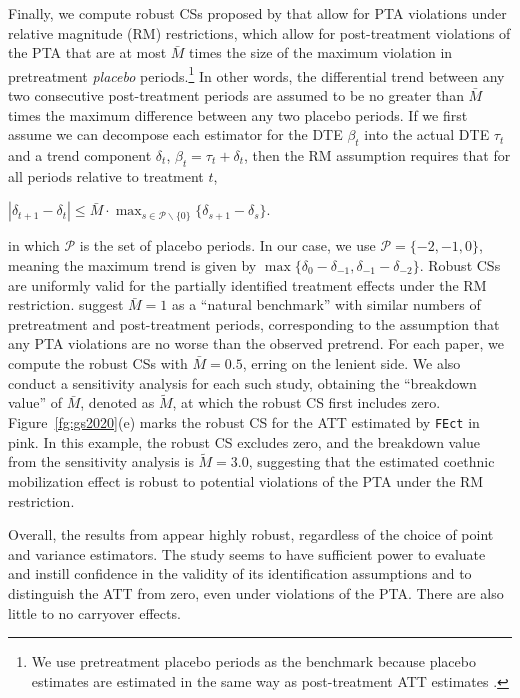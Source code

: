 \documentclass[12pt]{article}
\begin{document}
Finally, we compute robust CSs proposed by \citet{rambachan2023more} that allow for PTA violations under relative magnitude (RM) restrictions, which allow for post-treatment violations of the PTA that are at most $\bar{M}$ times the size of the maximum violation in pretreatment \emph{placebo} periods.\footnote{We use pretreatment placebo periods as the benchmark because placebo estimates are estimated in the same way as post-treatment ATT estimates \citep{Roth2024interpret}.} In other words, the differential trend between any two consecutive post-treatment periods are assumed to be no greater than $\bar{M}$ times the maximum difference between any two placebo periods. If we first assume we can decompose each estimator for the DTE $\beta_t$ into the actual DTE $\tau_t$ and a trend component $\delta_t$, $\beta_t=\tau_t+\delta_t$, then the RM assumption requires that for all periods relative to treatment $t$, 
\begin{center}
    $|\delta_{t+1}-\delta_t| \leq \bar{M} \cdot \max_{s\in \mathcal{P}\backslash\{0\}}\{\delta_{s+1} - \delta_s\}$. 
\end{center}
in which $\mathcal{P}$ is the set of placebo periods. In our case, we use $\mathcal{P}=\{-2, -1, 0\}$, meaning the maximum trend is given by $\max\{\delta_{0}-\delta_{-1}, \delta_{-1}-\delta_{-2}\}$. Robust CSs are uniformly valid for the partially identified treatment effects under the RM restriction. \citet[][p. 2653]{rambachan2023more} suggest $\bar{M}=1$ as a ``natural benchmark'' with similar numbers of pretreatment and post-treatment periods, corresponding to the assumption that any PTA violations are no worse than the observed pretrend.
For each paper, we compute the robust CSs with $\bar{M}=0.5$, erring on the lenient side. We also conduct a sensitivity analysis for each such study, obtaining the ``breakdown value'' of $\bar{M}$, denoted as $\tilde{M}$, at which the robust CS first includes zero. Figure~\ref{fg:gs2020}(e) marks the robust CS for the ATT estimated by \texttt{FEct} in pink. In this example, the robust CS excludes zero, and the breakdown value from the sensitivity analysis is $\tilde{M}=3.0$, suggesting that the estimated coethnic mobilization effect is robust to potential violations of the PTA under the RM restriction. 

Overall, the results from \citet{Grumbach2020} appear highly robust, regardless of the choice of point and variance estimators. The study seems to have sufficient power to evaluate and instill confidence in the validity of its identification assumptions and to distinguish the ATT from zero, even under violations of the PTA. There are also little to no carryover effects.
\end{document}
